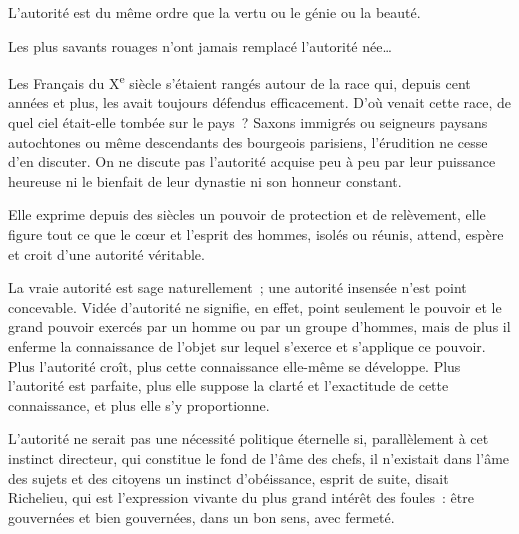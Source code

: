 \documentclass[french,twoside]{book} %
\newcommand{\astermono}{\medskip\centerline{\color{rubric}\large\selectfont{\syms ✻}}\medskip\par}%
\begin{document}
\astermono

\noindent L’autorité est du même ordre que la vertu ou le génie ou la beauté.\par
Les plus savants rouages n’ont jamais remplacé l’autorité née…\par

\astermono

\noindent Les Français du X\textsuperscript{e} siècle s’étaient rangés autour de la race qui, depuis cent années et plus, les avait toujours défendus efficacement. D’où venait cette race, de quel ciel était-elle tombée sur le pays ? Saxons immigrés ou seigneurs paysans autochtones ou même descendants des bourgeois parisiens, l’érudition ne cesse d’en discuter. On ne discute pas l’autorité acquise peu à peu par leur puissance heureuse ni le bienfait de leur dynastie ni son honneur constant.\par
Elle exprime depuis des siècles un pouvoir de protection et de relèvement, elle figure tout ce que le cœur et l’esprit des hommes, isolés ou réunis, attend, espère et croit d’une autorité véritable.\par

\astermono

\noindent La vraie autorité est sage naturellement ; une autorité insensée n’est point concevable. Vidée d’autorité ne signifie, en effet, point seulement le pouvoir et le grand pouvoir exercés par un homme ou par un groupe d’hommes, mais de plus il enferme la connaissance de l’objet sur lequel s’exerce et s’applique ce pouvoir. Plus l’autorité croît, plus cette connaissance elle-même se développe. Plus l’autorité est parfaite, plus elle suppose la clarté et l’exactitude de cette connaissance, et plus elle s’y proportionne.\par

\astermono

\noindent L’autorité ne serait pas une nécessité politique éternelle si, parallèlement à cet instinct directeur, qui constitue le fond de l’âme des chefs, il n’existait dans l’âme des sujets et des citoyens un instinct d’obéissance, esprit de suite, disait Richelieu, qui est l’expression vivante du plus grand intérêt des foules : être gouvernées et bien gouvernées, dans un bon sens, avec fermeté.
\end{document}
